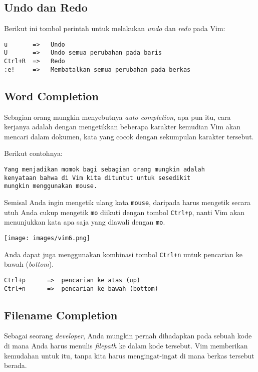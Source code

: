 \documentclass{article}
\begin{document}
\subsection{Undo dan Redo}
Berikut ini tombol perintah untuk melakukan \emph{undo} dan
\emph{redo} pada Vim:

\begin{verbatim}
u       =>   Undo
U       =>   Undo semua perubahan pada baris
Ctrl+R  =>   Redo
:e!     =>   Membatalkan semua perubahan pada berkas
\end{verbatim}

\subsection{Word Completion}
Sebagian orang mungkin menyebutnya \emph{auto completion},
apa pun itu, cara kerjanya adalah dengan mengetikkan
beberapa karakter kemudian Vim akan mencari dalam dokumen,
kata yang cocok dengan sekumpulan karakter tersebut.

Berikut contohnya:

\begin{verbatim}
Yang menjadikan momok bagi sebagian orang mungkin adalah
kenyataan bahwa di Vim kita dituntut untuk sesedikit 
mungkin menggunakan mouse.
\end{verbatim}

Semisal Anda ingin mengetik ulang kata \verb=mouse=,
daripada harus mengetik secara utuh Anda cukup mengetik
\verb=mo= diikuti dengan tombol \verb=Ctrl+p=, nanti Vim
akan menunjukkan kata apa saja yang diawali dengan
\verb=mo=.

\vspace{12pt}

\texttt{[image: images/vim6.png]}

Anda dapat juga menggunakan kombinasi tombol \verb=Ctrl+n=
untuk pencarian ke bawah (\emph{bottom}).

\begin{verbatim}
Ctrl+p      =>  pencarian ke atas (up)
Ctrl+n      =>  pencarian ke bawah (bottom)
\end{verbatim}

\subsection{Filename Completion}
Sebagai seorang \emph{developer}, Anda mungkin pernah
dihadapkan pada sebuah kode di mana Anda harus menulis
\emph{filepath} ke dalam kode tersebut. Vim memberikan
kemudahan untuk itu, tanpa kita harus mengingat-ingat di
mana berkas tersebut berada.
\end{document}
